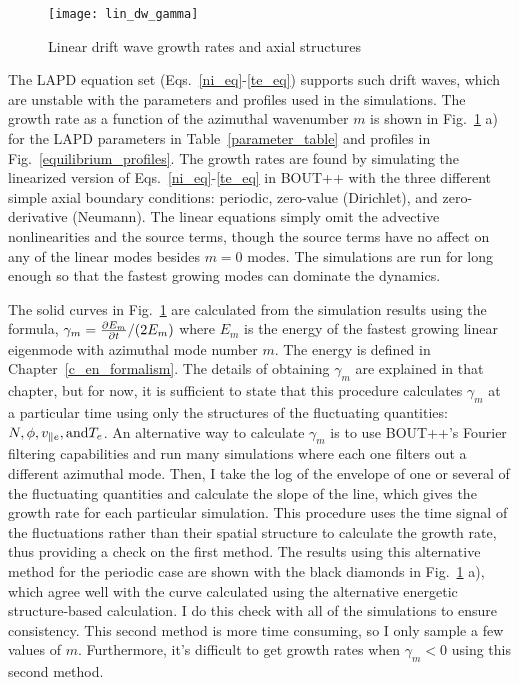 \begin{figure}[!ht]
\centerline{\texttt{[image: lin\_dw\_gamma]}}
\caption{Linear drift wave growth rates and axial structures}
\label{lin_dw_gamma}
\end{figure}

The LAPD equation set (Eqs.~\ref{ni_eq}-\ref{te_eq}) supports such drift waves, which are unstable with the parameters and profiles used in the simulations. 
The growth rate as a function of the azimuthal
wavenumber $m$ is shown in Fig.~\ref{lin_dw_gamma} a) for the LAPD parameters in Table~\ref{parameter_table} and profiles in Fig.~\ref{equilibrium_profiles}. The growth rates are found by simulating
the linearized version of Eqs.~\ref{ni_eq}-\ref{te_eq} in BOUT++ with the three different simple axial boundary conditions: periodic, zero-value (Dirichlet), and zero-derivative (Neumann). 
The linear equations simply omit the advective nonlinearities and the source terms, though the source terms have no affect on any of the linear modes besides $m=0$ modes. The simulations are run
for long enough so that the fastest growing modes can dominate the dynamics.

The solid curves in Fig.~\ref{lin_dw_gamma} are calculated from the simulation results using the formula, $\gamma_m = \frac{\partial E_m}{\partial t}/(2 E_m)$ where $E_m$ is the energy of the fastest
growing linear eigenmode with azimuthal mode number $m$.
The energy is defined in Chapter~\ref{c_en_formalism}. The details of obtaining $\gamma_m$ are explained in that chapter, but for now, it is sufficient to state that this procedure calculates
$\gamma_m$ at a particular time using only the structures of the fluctuating quantities: $N, \phi, v_{\parallel e}, {\rm and } T_e$. An alternative way to calculate $\gamma_m$ is to use BOUT++'s Fourier
filtering capabilities and run many simulations where each one filters out a different azimuthal mode. Then, I take the log of the envelope of one or several of the fluctuating quantities
and calculate the slope of the line, which gives the growth rate for each particular simulation. This procedure uses the time signal of the fluctuations rather than their spatial structure to
calculate the growth rate, thus providing a check on the first method. 
The results using this alternative method for the periodic case are shown with the black diamonds in Fig.~\ref{lin_dw_gamma} a), which agree well with the curve calculated using the 
alternative energetic structure-based calculation. I do this check with all of the simulations to ensure consistency. This second method is more time consuming, so I only sample a few values of $m$.
Furthermore, it's difficult to get growth rates when $\gamma_m < 0$ using this second method.

